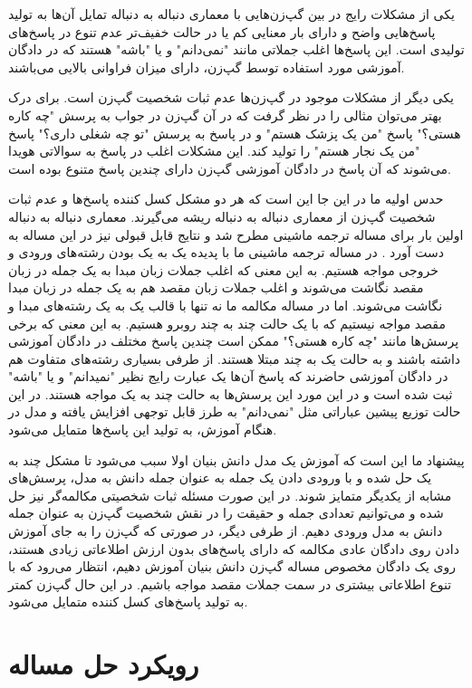 یکی از مشکلات رایج در بین گپ‌زن‌هایی با معماری دنباله به دنباله تمایل آن‌ها به تولید پاسخ‌هایی واضح و دارای بار معنایی کم یا در حالت  خفیف‌تر عدم تنوع در پاسخ‌های تولیدی است. این پاسخ‌ها اغلب جملاتی مانند 
"نمی‌دانم" و یا "باشه" هستند که در دادگان آموزشی مورد استفاده توسط گپ‌زن، دارای میزان فراوانی بالایی می‌باشند.

یکی دیگر از مشکلات موجود در گپ‌زن‌ها عدم ثبات شخصیت گپ‌زن است. برای درک بهتر می‌توان مثالی را در نظر گرفت که در آن گپ‌زن در جواب به پرسش "چه کاره هستی؟" پاسخ "من یک پزشک هستم" و در پاسخ به پرسش "تو چه شغلی داری؟" پاسخ "من یک نجار هستم" را تولید کند. این مشکلات اغلب در پاسخ به سوالاتی هویدا می‌شوند که آن پاسخ در دادگان آموزشی گپ‌زن دارای چندین پاسخ متنوع بوده است.

حدس اولیه ما در این جا این است که هر دو مشکل کسل کننده پاسخ‌ها و عدم ثبات شخصیت گپ‌زن از معماری دنباله به دنباله ریشه می‌گیرند. معماری دنباله به دنباله اولین بار برای مساله ترجمه ماشینی مطرح شد و نتایج قابل قبولی نیز در این مساله به دست آورد
\cite{seq2seq_paper}.
در مساله ترجمه ماشینی ما با پدیده یک به یک بودن رشته‌های ورودی و خروجی مواجه هستیم. به این معنی که اغلب جملات زبان مبدا به یک جمله در زبان مقصد نگاشت می‌شوند و اغلب جملات زبان مقصد هم به یک جمله در زبان مبدا نگاشت می‌شوند. اما در مساله مکالمه ما نه تنها با قالب یک به یک رشته‌های مبدا و مقصد مواجه نیستیم که با یک حالت چند به چند روبرو هستیم. به این معنی که برخی پرسش‌ها مانند "چه کاره هستی؟" ممکن است چندین پاسخ مختلف در دادگان آموزشی داشته باشند و به حالت یک به چند مبتلا هستند. از طرفی بسیاری رشته‌های متفاوت هم در دادگان آموزشی حاضرند که پاسخ آن‌ها یک عبارت رایج نظیر "نمیدانم" و یا "باشه" ثبت شده است و در این مورد این پرسش‌ها به حالت چند به یک مواجه هستند. در این حالت توزیع پیشین  عباراتی مثل "نمی‌دانم" به طرز قابل توجهی افزایش یافته و مدل در هنگام آموزش، به تولید این پاسخ‌ها متمایل می‌شود.

پیشنهاد ما این است که آموزش یک مدل دانش بنیان اولا سبب می‌شود تا مشکل چند به یک حل شده و با ورودی دادن یک جمله به عنوان جمله دانش به مدل، پرسش‌های مشابه از یکدیگر متمایز شوند. در این صورت مسئله ثبات شخصیتی مکالمه‌گر نیز حل شده و می‌توانیم تعدادی جمله و حقیقت را در نقش شخصیت گپ‌زن به عنوان جمله دانش به مدل ورودی دهیم. از طرفی دیگر، در صورتی که گپ‌زن را به جای آموزش دادن روی دادگان عادی مکالمه که دارای پاسخ‌های بدون ارزش اطلاعاتی زیادی هستند، روی یک دادگان مخصوص مساله گپ‌زن دانش بنیان آموزش دهیم، انتظار می‌رود که با تنوع اطلاعاتی بیشتری در سمت جملات مقصد مواجه باشیم. در این حال گپ‌زن کمتر به تولید پاسخ‌های کسل کننده متمایل می‌شود. 


\section{رویکرد حل مساله} \label{chap1:problem_solving_approach}

